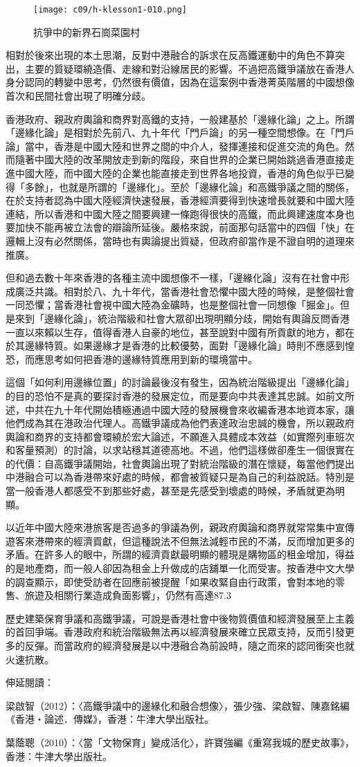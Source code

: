 \begin{figure}[htbp]
    \centering
    \texttt{[image: c09/h-klesson1-010.png]}
    \caption{抗爭中的新界石崗菜園村} 
\end{figure}

相對於後來出現的本土思潮，反對中港融合的訴求在反高鐵運動中的角色不算突出，主要的質疑環繞造價、走線和對沿線居民的影響。不過把高鐵爭議放在香港人身分認同的轉變中思考，仍然很有價值，因為在這案例中香港菁英階層的中國想像首次和民間社會出現了明確分歧。

香港政府、親政府輿論和商界對高鐵的支持，一般建基於「邊緣化論」之上。所謂「邊緣化論」是相對於先前八、九十年代「門戶論」的另一種空間想像。在「門戶論」當中，香港是中國大陸和世界之間的中介人，發揮連接和促進交流的角色。然而隨著中國大陸的改革開放走到新的階段，來自世界的企業已開始跳過香港直接走進中國大陸，而中國大陸的企業也能直接走到世界各地投資，香港的角色似乎已變得「多餘」，也就是所謂的「邊緣化」。至於「邊緣化論」和高鐵爭議之間的關係，在於支持者認為中國大陸經濟快速發展，香港經濟要得到快速增長就要和中國大陸連結，所以香港和中國大陸之間要興建一條跑得很快的高鐵，而此興建速度本身也要加快不能再被立法會的辯論所延後。嚴格來說，前面那句話當中的四個「快」在邏輯上沒有必然關係，當時也有輿論提出質疑，但政府卻當作是不證自明的道理來推廣。

但和過去數十年來香港的各種主流中國想像不一樣，「邊緣化論」沒有在社會中形成廣泛共識。相對於八、九十年代，當香港社會恐懼中國大陸的時候，是整個社會一同恐懼；當香港社會視中國大陸為金礦時，也是整個社會一同想像「掘金」。但是來到「邊緣化論」，統治階級和社會大眾卻出現明顯分歧，開始有輿論反問香港一直以來賴以生存，值得香港人自豪的地位，甚至說對中國有所貢獻的地方，都在於其邊緣特質。如果邊緣才是香港的比較優勢，面對「邊緣化論」時則不應感到惶恐，而應思考如何把香港的邊緣特質應用到新的環境當中。

這個「如何利用邊緣位置」的討論最後沒有發生，因為統治階級提出「邊緣化論」的目的恐怕不是真的要探討香港的發展定位，而是要向中共表達其忠誠。如前文所述，中共在九十年代開始積極通過中國大陸的發展機會來收編香港本地資本家，讓他們成為其在港政治代理人。高鐵爭議成為他們表達政治忠誠的機會，所以親政府輿論和商界的支持都會環繞於宏大論述，不願進入具體成本效益（如實際列車班次和客量預測）的討論，以求站穩其道德高地。不過，他們這樣做卻產生一個很實在的代價：自高鐵爭議開始，社會輿論出現了對統治階級的潛在懷疑，每當他們提出中港融合可以為香港帶來好處的時候，都會被質疑只是為自己的利益說話。特別是當一般香港人都感受不到那些好處，甚至是先感受到壞處的時候，矛盾就更為明顯。

以近年中國大陸來港旅客是否過多的爭議為例，親政府輿論和商界就常常集中宣傳遊客來港帶來的經濟貢獻，但這種說法不但無法減輕市民的不滿，反而增加更多的矛盾。在許多人的眼中，所謂的經濟貢獻最明顯的體現是購物區的租金增加，得益的是地產商，而一般人卻因為租金上升做成的店舖單一化而受害。按香港中文大學的調查顯示，即使受訪者在回應前被提醒「如果收緊自由行政策，會對本地的零售、旅遊及相關行業造成負面影響」，仍然有高達87.3%

歷史建築保育爭議和高鐵爭議，可說是香港社會中後物質價值和經濟發展至上主義的首回爭端。香港政府和統治階級無法再以經濟發展來確立民眾支持，反而引發更多的反彈。而當政府的經濟發展是以中港融合為前設時，隨之而來的認同衝突也就火速抗散。


伸延閱讀：

梁啟智（2012）：〈高鐵爭議中的邊緣化和融合想像〉，張少強、梁啟智、陳嘉銘編《香港‧論述．傳媒》，香港：牛津大學出版社。

葉蔭聰（2010）：〈當「文物保育」變成活化〉，許寶強編《重寫我城的歷史故事》，香港：牛津大學出版社。